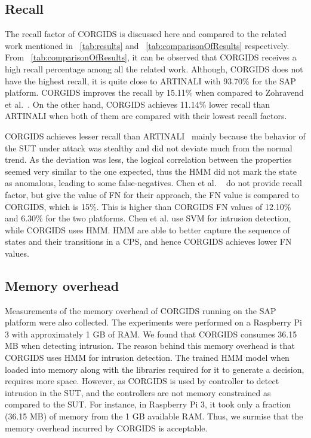 \subsection{Recall}
The recall factor of \ac{CORGIDS} is discussed here and compared to the related work mentioned in ~\autoref{tab:results} and ~\autoref{tab:comparisonOfResults} respectively. From  ~\autoref{tab:comparisonOfResults}, it can be observed that \ac{CORGIDS} receives a high recall percentage among all the related work. Although, \ac{CORGIDS} does not have the highest recall, it is quite close to ARTINALI with 93.70\% for the \ac{SAP} platform. \ac{CORGIDS} improves the recall by 15.11\% when compared to  Zohravend et al.~\cite{zohrevand2016hidden}. On the other hand, \ac{CORGIDS} achieves 11.14\% lower recall than ARTINALI when both of them are compared with their lowest recall factors. 

 
\ac{CORGIDS} achieves lesser recall than ARTINALI~\cite{aliabadi2017artinali} mainly because the behavior of the \ac{SUT} under attack was stealthy and did not deviate much from the normal trend. As the deviation was less, the logical correlation between the properties seemed very similar to the one expected, thus the \ac{HMM} did not mark the state as anomalous, leading to some false-negatives. Chen et al. ~\cite{chen2018learning} do not provide recall factor, but give the value of \ac{FN} for their approach, the \ac{FN} value is compared to \ac{CORGIDS}, which is 15\%. This is higher than \ac{CORGIDS} \ac{FN} values of 12.10\% and 6.30\% for the two platforms. Chen et al. use \ac{SVM} for intrusion detection, while \ac{CORGIDS} uses \ac{HMM}. \ac{HMM} are able to better capture the sequence of states and their transitions in a \ac{CPS}, and hence \ac{CORGIDS} achieves lower \ac{FN} values.

\subsection{Memory overhead}
Measurements of the memory overhead of \ac{CORGIDS} running on the \ac{SAP} platform were also collected. The experiments were performed on a Raspberry Pi 3 with approximately 1 GB of RAM. We found that \ac{CORGIDS} consumes 36.15 MB when detecting intrusion. The reason behind this memory overhead is that \ac{CORGIDS} uses \ac{HMM} for intrusion detection. The trained \ac{HMM} model when loaded into memory along with the libraries required for it to generate a decision, requires more space. However, as \ac{CORGIDS} is used by controller to detect intrusion in the \ac{SUT}, and the controllers are not memory constrained as compared to the \ac{SUT}. For instance, in Raspberry Pi 3, it took only a fraction (36.15 MB) of memory from the 1 GB available RAM. Thus, we surmise that the memory overhead incurred by \ac{CORGIDS} is acceptable.

